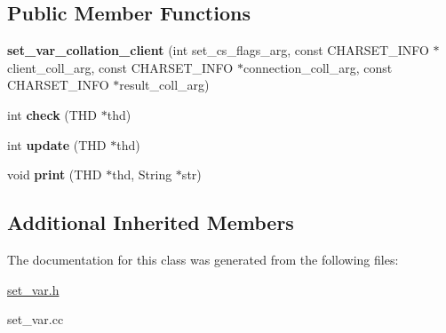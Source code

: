 \subsection*{Public Member Functions}
\begin{DoxyCompactItemize}
\item 
\mbox{\label{classset__var__collation__client_a4e3fddd2d943929b568dcfeedd25a6e5}} 
{\bfseries set\+\_\+var\+\_\+collation\+\_\+client} (int set\+\_\+cs\+\_\+flags\+\_\+arg, const C\+H\+A\+R\+S\+E\+T\+\_\+\+I\+N\+FO $\ast$client\+\_\+coll\+\_\+arg, const C\+H\+A\+R\+S\+E\+T\+\_\+\+I\+N\+FO $\ast$connection\+\_\+coll\+\_\+arg, const C\+H\+A\+R\+S\+E\+T\+\_\+\+I\+N\+FO $\ast$result\+\_\+coll\+\_\+arg)
\item 
\mbox{\label{classset__var__collation__client_aadd0e9bd7f92132463fc3779d761056a}} 
int {\bfseries check} (T\+HD $\ast$thd)
\item 
\mbox{\label{classset__var__collation__client_a83c6988d6a2132929321cf3d716e5970}} 
int {\bfseries update} (T\+HD $\ast$thd)
\item 
\mbox{\label{classset__var__collation__client_a25271fab795636734a15a6c19301951c}} 
void {\bfseries print} (T\+HD $\ast$thd, String $\ast$str)
\end{DoxyCompactItemize}
\subsection*{Additional Inherited Members}


The documentation for this class was generated from the following files\+:\begin{DoxyCompactItemize}
\item 
\mbox{\hyperlink{set__var_8h}{set\+\_\+var.\+h}}\item 
set\+\_\+var.\+cc\end{DoxyCompactItemize}
